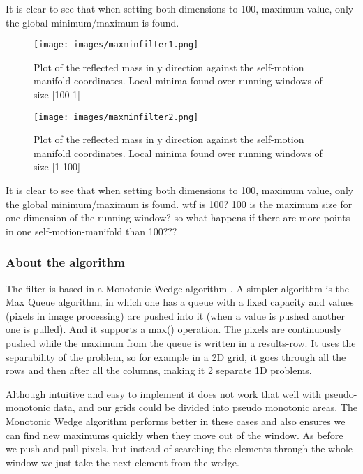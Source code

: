 It is clear to see that when setting both dimensions to 100, maximum value, only the global minimum/maximum is found.

\begin{figure}[htb]
	\centerline{
		\texttt{[image: images/maxminfilter1.png]}}
	\caption{Plot of the reflected mass in y direction against the self-motion
		manifold coordinates. Local minima found over running windows of size [100 1]}
	\label{fig:maxminfilter1}
\end{figure}

\begin{figure}[htb]
	\centerline{
		\texttt{[image: images/maxminfilter2.png]}}
	\caption{Plot of the reflected mass in y direction against the self-motion
		manifold coordinates. Local minima found over running windows of size [1 100]}
	\label{fig:maxminfilter1}
\end{figure}

It is clear to see that when setting both dimensions to 100, maximum value, only the global minimum/maximum is found. {\color{red} wtf is 100? 100 is the maximum size for one dimension of the running window? so what happens if there are more points in one self-motion-manifold than 100???}



\subsubsection{About the algorithm}
The filter \cite{minmaxfilter} is based in a Monotonic Wedge algorithm \cite{Lemire}.
A simpler algorithm is the Max Queue algorithm, in which one has a queue with a fixed capacity and values (pixels in image processing) are pushed into it (when a value is pushed another one is pulled). And it supports a max() operation. The pixels are continuously pushed while the maximum from the queue is written in a results-row.
It uses the separability of the problem, so for example in a 2D grid, it goes through all the rows and then after all the columns, making it 2 separate 1D problems.

Although intuitive and easy to implement it does not work that well with pseudo-monotonic data, and our grids could be divided into pseudo monotonic areas. The Monotonic Wedge algorithm performs better in these cases and also ensures we can find new maximums quickly when they move out of the window. As before we push and pull pixels, but instead of searching the elements through the whole window we just take the next element from the wedge.

